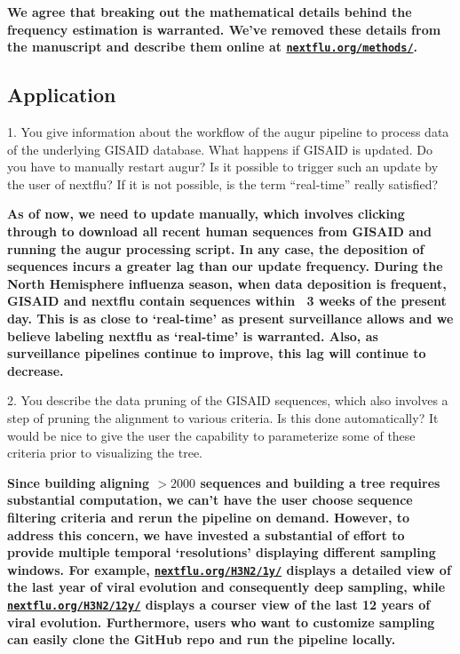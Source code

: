 \documentclass[11pt,oneside,letterpaper]{article}
\begin{document}
{\bf We agree that breaking out the mathematical details behind the frequency estimation is warranted. We've removed these details from the manuscript and describe them online at \href{http://nextflu.org/methods/}{\texttt{nextflu.org/methods/}}.}

\subsection*{Application}

1. You give information about the workflow of the augur pipeline to process data of the underlying GISAID database. What happens if GISAID is updated. Do you have to manually restart augur? Is it possible to trigger such an update by the user of nextflu? If it is not possible, is the term ``real-time'' really satisfied?

{\bf As of now, we need to update manually, which involves clicking through to download all recent human sequences from GISAID and running the augur processing script. In any case, the deposition of sequences incurs a greater lag than our update frequency. During the North Hemisphere influenza season, when data deposition is frequent, GISAID and nextflu contain sequences within ~3 weeks of the present day. This is as close to `real-time' as present surveillance allows and we believe labeling nextflu as `real-time' is warranted. Also, as surveillance pipelines continue to improve, this lag will continue to decrease.}

2. You describe the data pruning of the GISAID sequences, which also involves a step of pruning the alignment to various criteria. Is this done automatically? It would be nice to give the user the capability to parameterize some of these criteria prior to visualizing the tree.

{\bf Since building aligning $>2000$ sequences and building a tree requires substantial computation, we can't have the user choose sequence filtering criteria and rerun the pipeline on demand. However, to address this concern, we have invested a substantial of effort to provide multiple temporal `resolutions' displaying different sampling windows. For example, \href{http://nextflu.org/H3N2/1y/}{\texttt{nextflu.org/H3N2/1y/}} displays a detailed view of the last year of viral evolution and consequently deep sampling, while \href{http://nextflu.org/H3N2/12y/}{\texttt{nextflu.org/H3N2/12y/}} displays a courser view of the last 12 years of viral evolution. Furthermore, users who want to customize sampling can easily clone the GitHub repo and run the pipeline locally.}
\end{document}
